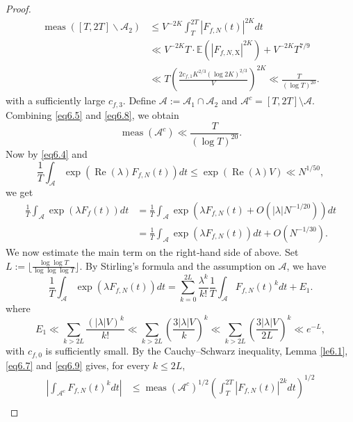 \documentclass[10pt,leqno]{amsart}
\numberwithin{equation}{section}
\begin{document}
\begin{proof}
\begin{equation}
\begin{aligned}
\operatorname{meas}\left([T, 2 T] \backslash \mathcal{A}_2\right) & \leqslant V^{-2 K} \int_T^{2 T}\left|F_{f,N}(t)\right|^{2 K} d t \\
& \ll V^{-2 K} T \cdot \mathbb{E}\left(\left|F_{f,N, \mathrm{X}}\right|^{2 K}\right)+V^{-2 K} T^{7 / 9} \\
& \ll T\left(\frac{2 c_{f,1} K^{2 /3}\left(\log 2K\right)^{2/3}}{V}\right)^{2 K} \ll \frac{T}{(\log T)^{20}}.
\end{aligned}
\end{equation}
with a sufficiently large $c_{f,3}$. Define $\mathcal{A} := \mathcal{A}_1 \cap \mathcal{A}_2$ and  $\mathcal{A}^c = [T, 2T] \setminus \mathcal{A}$. Combining \eqref{eq6.5} and \eqref{eq6.8}, we obtain
\begin{equation}\label{eq6.9}
    \operatorname{meas}\left(\mathcal{A}^c\right) \ll \frac{T}{(\log T)^{20}} .
\end{equation}
Now by \eqref{eq6.4} and 
\[
\frac{1}{T} \int_{\mathcal{A}} \exp \left(\operatorname{Re}(\lambda) F_{f,N}(t)\right) d t \leqslant \exp (\operatorname{Re}(\lambda) V) \ll N^{1 / 50},
\]
we get
\begin{equation}\label{eq6.10}
    \begin{aligned}
\frac{1}{T} \int_{\mathcal{A}} \exp (\lambda F_f(t)) d t & =\frac{1}{T} \int_{\mathcal{A}} \exp \left(\lambda F_{f,N}(t)+O\left(|\lambda| N^{-1 / 20}\right)\right) d t \\
& =\frac{1}{T} \int_{\mathcal{A}} \exp \left(\lambda F_{f,N}(t)\right) d t+O\left(N^{-1 / 30}\right).
\end{aligned}
\end{equation}
We now estimate the main term on the right‑hand side of above. Set $L := \bigl\lfloor \frac{\log \log T}{\log \log \log T}  \bigr\rfloor$. By Stirling’s formula and the assumption on $\mathcal{A}$, we have
\begin{equation}\label{eq6.11}
    \frac{1}{T} \int_{\mathcal{A}} \exp \left(\lambda F_{f,N}(t)\right) d t=\sum_{k=0}^{2 L} \frac{\lambda^k}{k!} \frac{1}{T} \int_{\mathcal{A}} F_{f,N}(t)^k d t+E_1.
\end{equation}
where
\[
E_1 \ll \sum_{k>2 L} \frac{(|\lambda| V)^k}{k!} \ll \sum_{k>2 L}\left(\frac{3|\lambda| V}{k}\right)^k \ll \sum_{k>2 L}\left(\frac{3|\lambda| V}{2 L}\right)^k \ll e^{-L},
\]
with $c_{f,0}$ is sufficiently small. By the Cauchy--Schwarz inequality, Lemma \ref{le6.1}, \eqref{eq6.7} and \eqref{eq6.9} gives, for every $k \leqslant 2L$,
\[
\begin{aligned}
\left|\int_{\mathcal{A}^c} F_{f,N}(t)^k d t\right| & \leqslant \operatorname{meas}\left(\mathcal{A}^c\right)^{1 / 2}\left(\int_T^{2 T}\left|F_{f,N}(t)\right|^{2 k} d t\right)^{1 / 2} \\

\end{aligned}\]
\end{proof}
\end{document}

